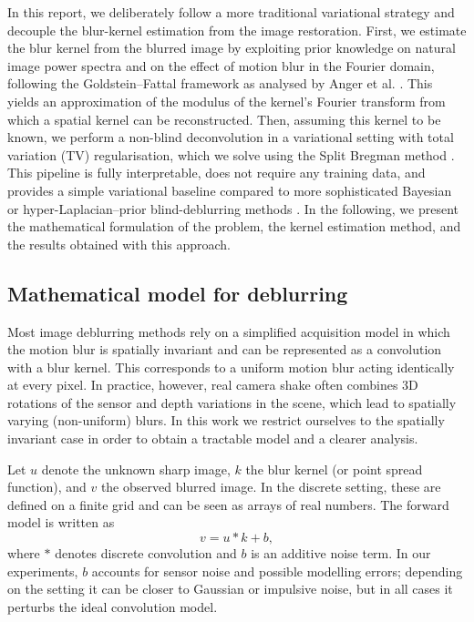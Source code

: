 \documentclass[a4paper,11pt]{article}
\begin{document}
In this report, we deliberately follow a more traditional variational strategy and decouple the blur-kernel estimation from the image restoration.
First, we estimate the blur kernel from the blurred image by exploiting prior knowledge on natural image power spectra and on the effect of motion blur in the Fourier domain, following the Goldstein–Fattal framework as analysed by Anger et al. \cite{gf}.
This yields an approximation of the modulus of the kernel’s Fourier transform from which a spatial kernel can be reconstructed.
Then, assuming this kernel to be known, we perform a non-blind deconvolution in a variational setting with total variation (TV) regularisation, which we solve using the Split Bregman method \cite{goldsb,tvipol}.
This pipeline is fully interpretable, does not require any training data, and provides a simple variational baseline compared to more sophisticated Bayesian or hyper-Laplacian–prior blind-deblurring methods \cite{MAP_bay,hyperlaplacian,hyperlap_blind}.
In the following, we present the mathematical formulation of the problem, the kernel estimation method, and the results obtained with this approach.

\subsection{Mathematical model for deblurring}
Most image deblurring methods rely on a simplified acquisition model in which the motion blur is spatially invariant and can be represented as a convolution with a blur kernel. This corresponds to a uniform motion blur acting identically at every pixel. In practice, however, real camera shake often combines 3D rotations of the sensor and depth variations in the scene, which lead to spatially varying (non-uniform) blurs. In this work we restrict ourselves to the spatially invariant case in order to obtain a tractable model and a clearer analysis.

Let $u$ denote the unknown sharp image, $k$ the blur kernel (or point spread function), and $v$ the observed blurred image. In the discrete setting, these are defined on a finite grid and can be seen as arrays of real numbers. The forward model is written as
\[
v = u * k + b,
\]
where $*$ denotes discrete convolution and $b$ is an additive noise term. In our experiments, $b$ accounts for sensor noise and possible modelling errors; depending on the setting it can be closer to Gaussian or impulsive noise, but in all cases it perturbs the ideal convolution model.
\end{document}
